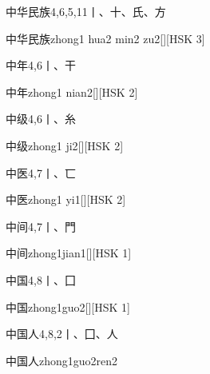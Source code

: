 \begin{entry}{中华民族}{4,6,5,11}{⼁、⼗、⽒、⽅}
  \begin{phonetics}{中华民族}{zhong1 hua2 min2 zu2}[][HSK 3]
  \end{phonetics}
\end{entry}

\begin{entry}{中年}{4,6}{⼁、⼲}
  \begin{phonetics}{中年}{zhong1 nian2}[][HSK 2]
  \end{phonetics}
\end{entry}

\begin{entry}{中级}{4,6}{⼁、⽷}
  \begin{phonetics}{中级}{zhong1 ji2}[][HSK 2]
  \end{phonetics}
\end{entry}

\begin{entry}{中医}{4,7}{⼁、⼖}
  \begin{phonetics}{中医}{zhong1 yi1}[][HSK 2]
  \end{phonetics}
\end{entry}

\begin{entry}{中间}{4,7}{⼁、⾨}
  \begin{phonetics}{中间}{zhong1jian1}[][HSK 1]
  \end{phonetics}
\end{entry}

\begin{entry}{中国}{4,8}{⼁、⼞}
  \begin{phonetics}{中国}{zhong1guo2}[][HSK 1]
  \end{phonetics}
\end{entry}

\begin{entry}{中国人}{4,8,2}{⼁、⼞、⼈}
  \begin{phonetics}{中国人}{zhong1guo2ren2}
  \end{phonetics}
\end{entry}

